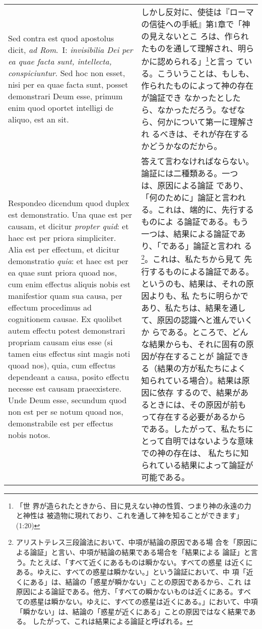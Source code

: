 \documentclass[10pt]{jsarticle}
\begin{document}
\begin{longtable}{p{21em}p{21em}}
\\



{\sc Sed contra est} quod apostolus dicit, {\it ad Rom}.~I: {\it
invisibilia Dei per ea quae facta sunt, intellecta,
conspiciuntur}. Sed hoc non esset, nisi per ea quae facta sunt, posset
demonstrari Deum esse, primum enim quod oportet intelligi de aliquo,
est an sit.

&

しかし反対に、使徒は『ローマの信徒への手紙』第1章で「神の見えないとこ
ろは、作られたものを通して理解され、明らかに認められる」\footnote{「世
界が造られたときから、目に見えない神の性質、つまり神の永遠の力と神性は
被造物に現れており、これを通して神を知ることができます」(1:20)}と言っ
ている。こういうことは、もしも、作られたものによって神の存在が論証でき
なかったとしたら、なかっただろう。なぜなら、何かについて第一に理解され
るべきは、それが存在するかどうかなのだから。


\\



{\sc Respondeo dicendum} quod duplex est demonstratio. Una quae est
per causam, et dicitur {\it propter quid}: et haec est per priora
simpliciter. Alia est per effectum, et dicitur demonstratio {\it
quia}: et haec est per ea quae sunt priora quoad nos, cum enim
effectus aliquis nobis est manifestior quam sua causa, per effectum
procedimus ad cognitionem causae. Ex quolibet autem effectu potest
demonstrari propriam causam eius esse (si tamen eius effectus sint
magis noti quoad nos), quia, cum effectus dependeant a causa, posito
effectu necesse est causam praeexistere. Unde Deum esse, secundum quod
non est per se notum quoad nos, demonstrabile est per effectus nobis
notos.

&

答えて言わなければならない。論証には二種類ある。一つは、原因による論証
であり、「何のために」論証と言われる。これは、端的に、先行するものによ
る論証である。もう一つは、結果による論証であり、「である」論証と言われ
る\footnote {アリストテレス三段論法において、中項が結論の原因である場
合を「原因による論証」と言い、中項が結論の結果である場合を「結果による
論証」と言う。たとえば、「すべて近くにあるものは瞬かない。すべての惑星
は近くにある。ゆえに、すべての惑星は瞬かない。」という論証において、中
項「近くにある」は、結論の「惑星が瞬かない」ことの原因であるから、これ
は原因による論証である。他方、「すべての瞬かないものは近くにある。すべ
ての惑星は瞬かない。ゆえに、すべての惑星は近くにある。」において、中項
「瞬かない」は、結論の「惑星が近くにある」ことの原因ではなく結果である。
したがって、これは結果による論証と呼ばれる。}。これは、私たちから見て
先行するものによる論証である。というのも、結果は、それの原因よりも、私
たちに明らかであり、私たちは、結果を通して、原因の認識へと進んでいくか
らである。ところで、どんな結果からも、それに固有の原因が存在することが
論証できる（結果の方が私たちによく知られている場合）。結果は原因に依存
するので、結果があるときには、その原因が前もって存在する必要があるから
である。したがって、私たちにとって自明ではないような意味での神の存在は、
私たちに知られている結果によって論証が可能である。


\end{longtable}
\end{document}
